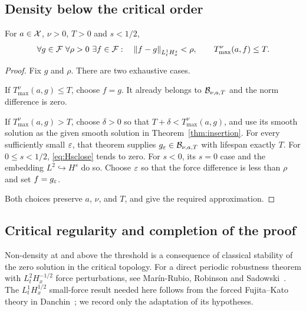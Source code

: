 \subsection{Density below the critical order}\label{sec:density}
\begin{proposition}\label{prop:density}
For $a\in\mathcal X$, $\nu>0$, $T>0$ and $s<1/2$,
\[
 \forall g\in\mathcal F\ \forall\rho>0\ \exists f\in\mathcal F:
 \quad \left\lVert f-g\right\rVert_{L^1_tH^s_x}<\rho,\qquad
       T_{\max}^{\nu}(a,f)\le T.
\]
\end{proposition}
\begin{proof}
Fix $g$ and $\rho$. There are two exhaustive cases.

If $T_{\max}^{\nu}(a,g)\le T$, choose $f=g$. It already belongs to
$\mathcal B_{\nu,a,T}$ and the norm difference is zero.

If $T_{\max}^{\nu}(a,g)>T$, choose $\delta>0$ so that
$T+\delta<T_{\max}^{\nu}(a,g)$, and use its smooth solution as the given smooth solution in Theorem~\ref{thm:insertion}. For every sufficiently small $\varepsilon$, that theorem supplies $g_\varepsilon\in\mathcal B_{\nu,a,T}$ with lifespan exactly $T$.
For $0\le s<1/2$, \eqref{eq:Hsclose} tends to zero. For $s<0$, its $s=0$ case and the embedding $L^2\hookrightarrow H^s$ do so. Choose $\varepsilon$ so that the force difference is less than $\rho$ and set $f=g_\varepsilon$.

Both choices preserve $a$, $\nu$, and $T$, and give the required approximation.
\end{proof}

\subsection{Critical regularity and completion of the proof}\label{sec:critical}
Non-density at and above the threshold is a consequence of classical
stability of the zero solution in the critical topology. For a direct
periodic robustness theorem with $L^2_tH^{-1/2}_x$ force perturbations, see
Mar\'in-Rubio, Robinson and Sadowski~\cite[Theorem~3, author manuscript
pp.~6--7]{mrrs}. The $L^1_tH^{1/2}_x$ small-force result needed here follows
from the forced Fujita--Kato theory in Danchin~\cite[Theorem~2.3.1,
pp.~47--49]{danchin}; we record only the adaptation of its hypotheses.

